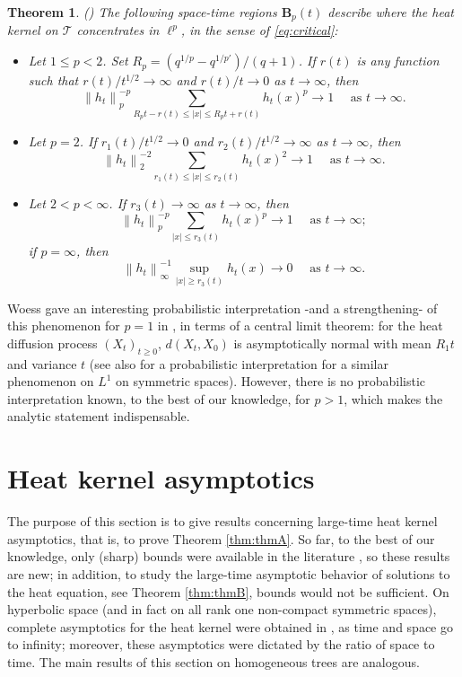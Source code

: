 \documentclass[11pt,a4paper,reqno]{amsart}
\renewcommand\mathcal{\mathscr}
\theoremstyle{plain}
\newtheorem{theorem}{Theorem}[section]
\theoremstyle{remark}
\theoremstyle{definition}
\theoremstyle{remark}
\numberwithin{equation}{section}
\begin{document}
	\begin{theorem}(\cite[p.1740]{MedSe}) \label{prop:MedSe_ellp} The following space-time regions $\textbf{B}_p(t)$ describe where the heat kernel on $\mathcal{T}$ concentrates in  $\ell^p$, in the sense of \eqref{eq:critical}:		
	\begin{itemize}
			\item[(i)] Let $1 \leq p<2$. Set $R_p = (q^{1/p} - q^{1/p'})/(q+1)$. If $r(t)$ is any function such that $r(t) / t^{1 / 2} \to\infty$ and $r(t)/t\to 0$ as $t \to\infty$, then
			$$
			\left\|h_t\right\|_p^{-p} \sum_{R_p t-r(t) \leq|x| \leq R_p t+r(t)} h_t(x)^p \to 1 \quad \text { as } t \to\infty .
			$$
			\item[(ii)] Let $p=2$. If $r_1(t) / t^{1 / 2} \to 0$ and $r_2(t) / t^{1 / 2} \to\infty$ as $t \to\infty$, then
			$$
			\left\|h_t\right\|_2^{-2} \sum_{r_1(t) \leq|x| \leq r_2(t)} h_t(x)^2 \to 1 \quad \text { as } t \to\infty .
			$$
			\item[(iii)] Let $2<p<\infty$. If $r_3(t) \to\infty$ as $t \to\infty$, then
			$$
			\left\|h_t\right\|_p^{-p} \sum_{|x| \leq r_3(t)} h_t(x)^p \to 1 \quad \text { as } t \to\infty;
			$$
			if $p=\infty$, then 
			$$
			\left\|h_t\right\|_{\infty}^{-1} \sup _{|x| \geq r_3(t)} h_t(x) \to 0 \quad \text { as } t \to\infty.
			$$
		\end{itemize}
	\end{theorem}
 Woess gave an interesting probabilistic interpretation -and a strengthening- of this phenomenon for $p=1$ in \cite{Woess}, in terms of a central limit theorem: for the heat diffusion process $(X_t)_{t\geq  0}$, $d(X_t, X_0)$ is asymptotically normal with mean $R_1t$ and variance $t$ (see also \cite{Bab} for a probabilistic interpretation for a similar phenomenon on $L^1$ on symmetric spaces). However, there is no probabilistic interpretation known, to the best of our knowledge, for $p>1$, which makes the analytic statement indispensable.
	
	\section{Heat kernel asymptotics}\label{sec:3}
	The purpose of this section is to give results concerning large-time heat kernel asymptotics, that is, to prove Theorem \ref{thm:thmA}. So far, to the best of our knowledge, only (sharp) bounds were available in the literature \cite{CMS}, so these results are new; in addition, to study the large-time asymptotic behavior of solutions to the heat equation, see Theorem \ref{thm:thmB}, bounds would not be sufficient. On hyperbolic space (and in fact on all rank one non-compact symmetric spaces), complete asymptotics for the heat kernel were obtained in \cite[p.1080]{AJ99}, as time and space go to infinity; moreover, these asymptotics were dictated by the ratio of space to time. The main results of this section on homogeneous trees are analogous.
	
\end{document}
